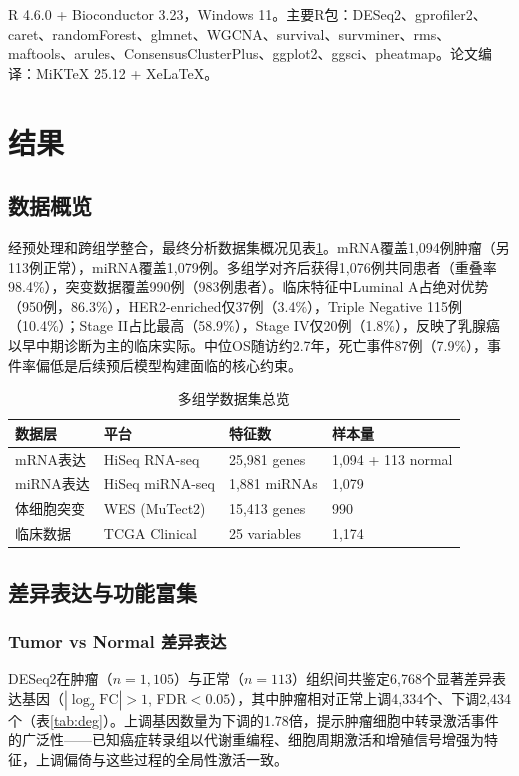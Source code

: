 \documentclass[12pt,a4paper]{ctexart}
\begin{document}
R 4.6.0 + Bioconductor 3.23，Windows 11。主要R包：DESeq2、gprofiler2、caret、randomForest、glmnet、WGCNA、survival、survminer、rms、maftools、arules、ConsensusClusterPlus、ggplot2、ggsci、pheatmap。论文编译：MiKTeX 25.12 + XeLaTeX。

\section{结果}

\subsection{数据概览}

经预处理和跨组学整合，最终分析数据集概况见表\ref{tab:data}。mRNA覆盖1,094例肿瘤（另113例正常），miRNA覆盖1,079例。多组学对齐后获得1,076例共同患者（重叠率98.4\%），突变数据覆盖990例（983例患者）。临床特征中Luminal A占绝对优势（950例，86.3\%），HER2-enriched仅37例（3.4\%），Triple Negative 115例（10.4\%）；Stage II占比最高（58.9\%），Stage IV仅20例（1.8\%），反映了乳腺癌以早中期诊断为主的临床实际。中位OS随访约2.7年，死亡事件87例（7.9\%），事件率偏低是后续预后模型构建面临的核心约束。

\begin{table}[H]
\centering
\caption{多组学数据集总览}
\label{tab:data}
\begin{tabular}{llll}
\toprule
数据层 & 平台 & 特征数 & 样本量 \\
\midrule
mRNA表达 & HiSeq RNA-seq & 25,981 genes & 1,094 + 113 normal \\
miRNA表达 & HiSeq miRNA-seq & 1,881 miRNAs & 1,079 \\
体细胞突变 & WES (MuTect2) & 15,413 genes & 990 \\
临床数据 & TCGA Clinical & 25 variables & 1,174 \\
\bottomrule
\end{tabular}
\end{table}

\subsection{差异表达与功能富集}

\subsubsection{Tumor vs Normal 差异表达}

DESeq2在肿瘤（$n=1,105$）与正常（$n=113$）组织间共鉴定6,768个显著差异表达基因（$|\log_2\text{FC}|>1$, FDR$<0.05$），其中肿瘤相对正常上调4,334个、下调2,434个（表\ref{tab:deg}）。上调基因数量为下调的1.78倍，提示肿瘤细胞中转录激活事件的广泛性——已知癌症转录组以代谢重编程、细胞周期激活和增殖信号增强为特征，上调偏倚与这些过程的全局性激活一致。
\end{document}
